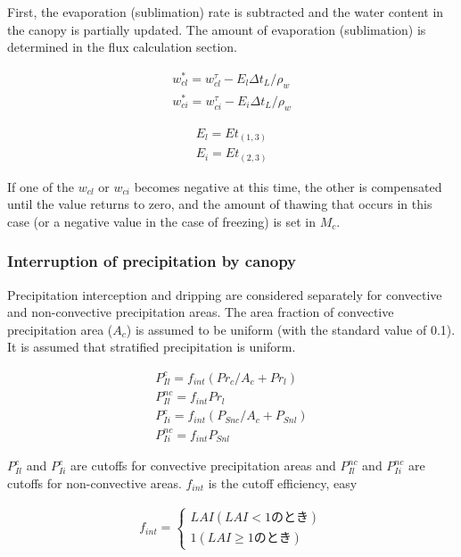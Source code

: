 First, the evaporation (sublimation) rate is subtracted and the water
content in the canopy is partially updated. The amount of evaporation
(sublimation) is determined in the flux calculation section.

\begin{eqnarray}
 w_{cl}^* = w_{cl}^{\tau} - E_l \Delta t_L / \rho_w \\
 w_{ci}^* = w_{ci}^{\tau} - E_i \Delta t_L / \rho_w
\end{eqnarray}

\begin{eqnarray}
 E_l = Et_{(1,3)} \\
 E_i = Et_{(2,3)}
\end{eqnarray}

If one of the \(w_{cl}\) or \(w_{ci}\) becomes negative at this time,
the other is compensated until the value returns to zero, and the amount
of thawing that occurs in this case (or a negative value in the case of
freezing) is set in \(M_c\).

\hypertarget{interruption-of-precipitation-by-canopy}{%
\subsubsection{Interruption of precipitation by
canopy}\label{interruption-of-precipitation-by-canopy}}

Precipitation interception and dripping are considered separately for
convective and non-convective precipitation areas. The area fraction of
convective precipitation area (\(A_c\)) is assumed to be uniform (with
the standard value of 0.1). It is assumed that stratified precipitation
is uniform.

\begin{eqnarray}
 P_{Il}^{c}  = f_{int} ( Pr_c / A_c + Pr_l ) \\
 P_{Il}^{nc} = f_{int} Pr_l \\
 P_{Ii}^{c}  = f_{int} ( P_{Snc} / A_c + P_{Snl} ) \\
 P_{Ii}^{nc} = f_{int} P_{Snl}
\end{eqnarray}

\(P_{Il}^{c}\) and \(P_{Ii}^{c}\) are cutoffs for convective
precipitation areas and \(P_{Il}^{nc}\) and \(P_{Ii}^{nc}\) are cutoffs
for non-convective areas. \(f_{int}\) is the cutoff efficiency, easy

\begin{eqnarray}
 f_{int} = \left\{
\begin{array}{ll}
 LAI  (LAI < 1 {のとき})\\
 1    (LAI \geq 1 {のとき})
\end{array}
\right.
\end{eqnarray}

